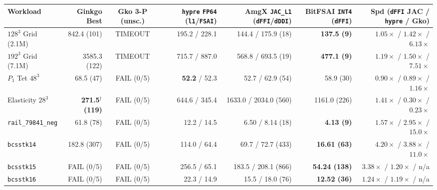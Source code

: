 \documentclass[10pt]{article}
\begin{document}
\begin{table}[t]
\centering\scriptsize
\begin{tabular}{@{}lrcrrrr@{}}
\toprule
Workload & Ginkgo Best & Gko 3-P (unsc.) & \texttt{hypre} \texttt{FP64} (\texttt{l1}/\texttt{FSAI}) & AmgX \texttt{JAC\_L1} (\texttt{dFFI}/\texttt{dDDI}) & BitFSAI \texttt{INT4} (\texttt{dFFI}) & Spd (\texttt{dFFI} JAC / \texttt{hypre} / Gko) \\
\midrule
$128^3$ Grid (2.1M) & 842.4 (101) & TIMEOUT & 195.2 / 228.1 & 144.4 / 175.9 (18) & \textbf{137.5 (9)} & $1.05\times$ / $\mathbf{1.42\times}$ / $\mathbf{6.13\times}$ \\
$192^3$ Grid (7.1M) & 3585.3 (122) & TIMEOUT & 715.7 / 887.0 & 568.8 / 693.5 (19) & \textbf{477.1 (9)} & $\mathbf{1.19\times}$ / $\mathbf{1.50\times}$ / $\mathbf{7.51\times}$ \\
$P_1$ Tet $48^3$ & 68.5 (47) & FAIL (0/5) & \textbf{52.2} / 52.3 & 52.7 / 62.9 (54) & 58.9 (30) & $0.90\times$ / $0.89\times$ / $\mathbf{1.16\times}$ \\
Elasticity $28^3$ & \textbf{271.5}$^\dagger$ \textbf{(119)} & FAIL (0/5) & 644.6 / 345.4 & 1633.0 / 2034.0 (560) & 1161.0 (226) & $\mathbf{1.41\times}$ / $0.30\times$ / $0.23\times$ \\
\texttt{rail\_79841\_neg} & 61.8 (78) & FAIL (0/5) & 12.2 / 14.5 & 6.50 / 8.14 (18) & \textbf{4.13 (9)} & $\mathbf{1.57\times}$ / $\mathbf{2.95\times}$ / $\mathbf{15.0\times}$ \\
\texttt{bcsstk14} & 182.8 (307) & FAIL (0/5) & 114.0 / 64.4 & 69.7 / 72.7 (433) & \textbf{16.61 (63)} & $\mathbf{4.20\times}$ / $\mathbf{3.88\times}$ / $\mathbf{11.0\times}$ \\
\texttt{bcsstk15} & FAIL (0/5) & FAIL (0/5) & 256.5 / 65.1 & 183.5 / 208.1 (866) & \textbf{54.24 (138)} & $\mathbf{3.38\times}$ / $\mathbf{1.20\times}$ / n/a \\
\texttt{bcsstk16} & FAIL (0/5) & FAIL (0/5) & 22.3 / 14.9 & 15.5 / 18.0 (76) & \textbf{12.52 (36)} & $\mathbf{1.24\times}$ / $\mathbf{1.19\times}$ / n/a \\
\bottomrule
\end{tabular}

\end{table}
\end{document}
